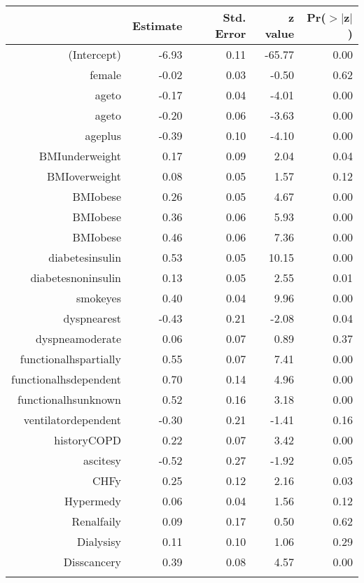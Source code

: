 \bigskip\bigskip
\centering
\begin{tabular}{rrrrr}
  \hline
 & Estimate & Std. Error & z value & Pr($>$$|$z$|$) \\ 
  \hline
(Intercept) & -6.93 & 0.11 & -65.77 & 0.00 \\ 
  female & -0.02 & 0.03 & -0.50 & 0.62 \\ 
  age\-65\-to\-74 & -0.17 & 0.04 & -4.01 & 0.00 \\ 
  age\-75\-to\-84 & -0.20 & 0.06 & -3.63 & 0.00 \\ 
  age\-85\-plus & -0.39 & 0.10 & -4.10 & 0.00 \\ 
  BMI\-underweight & 0.17 & 0.09 & 2.04 & 0.04 \\ 
  BMI\-overweight & 0.08 & 0.05 & 1.57 & 0.12 \\ 
  BMI\-obese\-1 & 0.26 & 0.05 & 4.67 & 0.00 \\ 
  BMI\-obese\-2 & 0.36 & 0.06 & 5.93 & 0.00 \\ 
  BMI\-obese\-3 & 0.46 & 0.06 & 7.36 & 0.00 \\ 
  diabetes\-insulin & 0.53 & 0.05 & 10.15 & 0.00 \\ 
  diabetes\-noninsulin & 0.13 & 0.05 & 2.55 & 0.01 \\ 
  smoke\-yes & 0.40 & 0.04 & 9.96 & 0.00 \\ 
  dyspnea\-rest & -0.43 & 0.21 & -2.08 & 0.04 \\ 
  dyspnea\-moderate & 0.06 & 0.07 & 0.89 & 0.37 \\ 
  functional\-hs\-partially & 0.55 & 0.07 & 7.41 & 0.00 \\ 
  functional\-hs\-dependent & 0.70 & 0.14 & 4.96 & 0.00 \\ 
  functional\-hs\-unknown & 0.52 & 0.16 & 3.18 & 0.00 \\ 
  ventilator\-dependent & -0.30 & 0.21 & -1.41 & 0.16 \\ 
  history\-COPD & 0.22 & 0.07 & 3.42 & 0.00 \\ 
  ascites\-y & -0.52 & 0.27 & -1.92 & 0.05 \\ 
  CHF\-y & 0.25 & 0.12 & 2.16 & 0.03 \\ 
  Hyper\-med\-y & 0.06 & 0.04 & 1.56 & 0.12 \\ 
  Renal\-fail\-y & 0.09 & 0.17 & 0.50 & 0.62 \\ 
  Dialysis\-y & 0.11 & 0.10 & 1.06 & 0.29 \\ 
  Diss\-cancer\-y & 0.39 & 0.08 & 4.57 & 0.00 \\ 
$$
\end{tabular}
